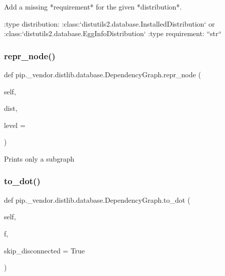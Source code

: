 \begin{DoxyVerb}Add a missing *requirement* for the given *distribution*.

:type distribution: :class:`distutils2.database.InstalledDistribution`
            or :class:`distutils2.database.EggInfoDistribution`
:type requirement: ``str``
\end{DoxyVerb}
 \mbox{\label{classpip_1_1__vendor_1_1distlib_1_1database_1_1DependencyGraph_ae34e4ffde44d8f82b4ca446e51c81a2c}} 
\subsubsection{\texorpdfstring{repr\+\_\+node()}{repr\_node()}}
{\footnotesize\ttfamily def pip.\+\_\+vendor.\+distlib.\+database.\+Dependency\+Graph.\+repr\+\_\+node (\begin{DoxyParamCaption}\item[{}]{self,  }\item[{}]{dist,  }\item[{}]{level = {} }\end{DoxyParamCaption})}

\begin{DoxyVerb}Prints only a subgraph\end{DoxyVerb}
 \mbox{\label{classpip_1_1__vendor_1_1distlib_1_1database_1_1DependencyGraph_a781f2bf3dce5bbc552bdb7f5fd6b5e9b}} 
\subsubsection{\texorpdfstring{to\+\_\+dot()}{to\_dot()}}
{\footnotesize\ttfamily def pip.\+\_\+vendor.\+distlib.\+database.\+Dependency\+Graph.\+to\+\_\+dot (\begin{DoxyParamCaption}\item[{}]{self,  }\item[{}]{f,  }\item[{}]{skip\+\_\+disconnected = {\ttfamily True} }\end{DoxyParamCaption})}

